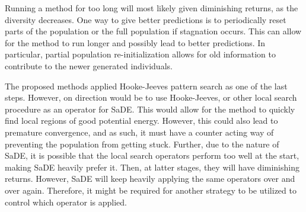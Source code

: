 Running a method for too long will most likely given diminishing returns, as
the diversity decreases. One way to give better predictions is to periodically
reset parts of the population or the full population if stagnation occurs. This
can allow for the method to run longer and possibly lead to better predictions.
In particular, partial population re-initialization allows for old information
to contribute to the newer generated individuals.

The proposed methods applied Hooke-Jeeves pattern search as one of the last steps.
However, on direction would be to use Hooke-Jeeves, or other local search
procedure as an operator for SaDE. This would allow for the method to quickly
find local regions of good potential energy. However, this could also lead to
premature convergence, and as such, it must have a counter acting way of
preventing the population from getting stuck. Further, due to the nature of
SaDE, it is possible that the local search operators perform too well at the
start, making SaDE heavily prefer it. Then, at latter stages, they will
have diminishing returns. However, SaDE will keep heavily applying the
same operators over and over again. Therefore, it might be required for another
strategy to be utilized to control which operator is applied.

